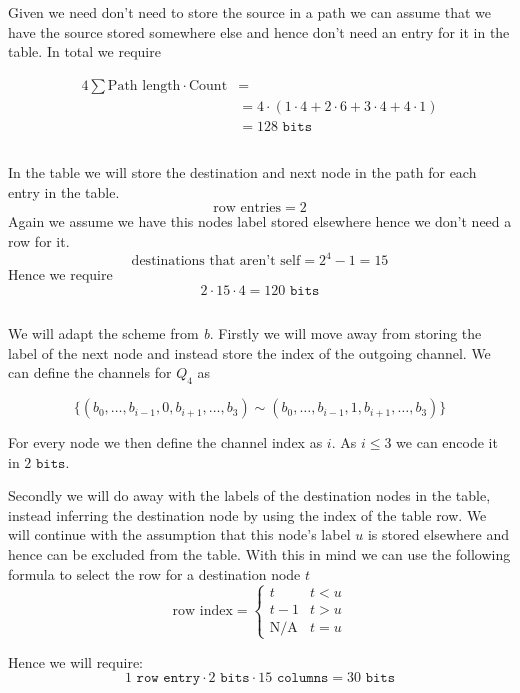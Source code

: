 Given we need don't need to store the source in a path we can assume that we have the source stored somewhere else and hence don't need an entry for it in the table.
In total we require 

\begin{align*}
    4\sum \text{Path length} \cdot \text{Count}&=\\
    &=4\cdot(1\cdot 4 + 2 \cdot 6 + 3 \cdot 4+ 4 \cdot 1)\\
    &= 128 \texttt{ bits}
\end{align*}
\subsection{}
In the table we will store the destination and next node in the path for each entry in the table.
\[\text{row entries}=2\]
Again we assume we have this nodes label stored elsewhere hence we don't need a row for it.
\[\text{destinations that aren't self}=2^4-1=15\]
Hence we require
\[2\cdot 15 \cdot 4 = 120 \texttt{ bits}\]

\subsection{}
We will adapt the scheme from \textit{b}.
Firstly we will move away from storing the label of the next node and instead store the index of the outgoing channel.
We can define the channels for $Q_4$ as

\[\{(b_0, \ldots, b_{i-1}, 0, b_{i+1}, \ldots, b_{3})\sim (b_0, \ldots, b_{i-1}, 1, b_{i+1}, \ldots, b_{3})\}\]

For every node we then define the channel index  as $i$. 
As $i\leq 3$ we can encode it in $2 \texttt{ bits}$.

Secondly we will do away with the labels of the destination nodes in the table, instead inferring the destination node by using the index of the table row. 
We will continue with the assumption that this node's label $u$ is stored elsewhere and hence can be excluded from the table.
With this in mind we can use the following formula to select the row for a destination node $t$  
\[ \text{row index} = 
    \begin{cases} 
      t & t<u \\
      t-1 & t>u \\
      \text{N/A} & t=u 
   \end{cases}
\]


Hence we will require:
\[1 \texttt{ row entry}\cdot 2 \texttt{ bits}\cdot 15 \texttt{ columns}  = 30 \texttt{ bits}\]


